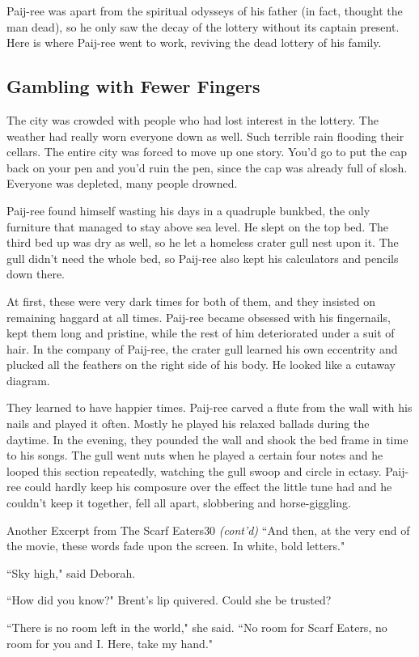 \documentclass[12pt,twoside]{report}
\begin{document}
Paij-ree was apart from the spiritual odysseys of his father (in fact,
thought the man dead), so he only saw the decay of the lottery without
its captain present.  Here is where Paij-ree went to work, reviving
the dead lottery of his family.



\subsection{Gambling with Fewer Fingers}



The city was crowded with people who had lost interest in the lottery.
The weather had really worn everyone down as well.  Such terrible rain
flooding their cellars. The entire city was forced to move up one
story.  You'd go to put the cap back on your pen and you'd ruin the
pen, since the cap was already full of slosh.  Everyone was depleted,
many people drowned.

Paij-ree found himself wasting his days in a quadruple bunkbed, the
only furniture that managed to stay above sea level.  He slept on the
top bed.  The third bed up was dry as well, so he let a homeless
crater gull nest upon it.  The gull didn't need the whole bed, so
Paij-ree also kept his calculators and pencils down there.

At first, these were very dark times for both of them, and they
insisted on remaining haggard at all times.  Paij-ree became obsessed
with his fingernails, kept them long and pristine, while the rest of
him deteriorated under a suit of hair.  In the company of Paij-ree,
the crater gull learned his own eccentrity and plucked all the
feathers on the right side of his body.  He looked like a cutaway
diagram.

They learned to have happier times.  Paij-ree carved a flute from the
wall with his nails and played it often.  Mostly he played his relaxed
ballads during the daytime.  In the evening, they pounded the wall and
shook the bed frame in time to his songs.  The gull went nuts when he
played a certain four notes and he looped this section repeatedly,
watching the gull swoop and circle in ectasy.  Paij-ree could hardly
keep his composure over the effect the little tune had and he couldn't
keep it together, fell all apart, slobbering and horse-giggling.

	\begin{sidebar}{Another Excerpt from The Scarf Eaters}{30}
		\textit{(cont'd)} ``And then, at the very end of the movie, these words fade upon the screen. In white, bold letters."\vspace{6pt}
		
		``Sky high," said Deborah.\vspace{6pt}
	
		``How did you know?" Brent's lip quivered. Could she be trusted?\vspace{6pt}
	
		``There is no room left in the world," she said. ``No room for Scarf Eaters, no room for you and I. Here, take my hand."
	\end{sidebar}
\end{document}
